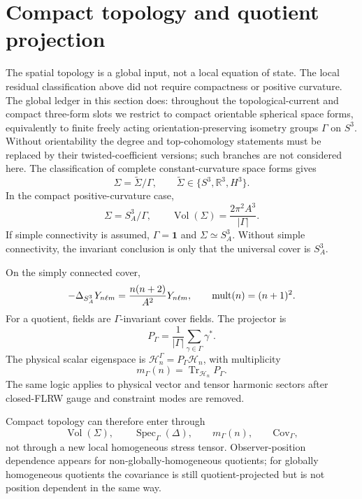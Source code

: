 \documentclass[
  aps,
  prd,
  reprint,
  superscriptaddress,
  floatfix,
  nofootinbib,
  longbibliography
]{revtex4-2}
\theoremstyle{plain}
\theoremstyle{definition}
\theoremstyle{remark}
\DeclareMathOperator{\Vol}{Vol}
\DeclareMathOperator{\Spec}{Spec}
\DeclareMathOperator{\Tr}{Tr}
\newcommand{\id}{\mathbf 1}
\newcommand{\R}{\mathbb R}
\newcommand{\PG}{P_\Gamma}
\newcommand{\Hn}{\mathcal H_n}
\begin{document}
\section{Compact topology and quotient projection}

The spatial topology is a global input, not a local equation of state.
The local residual classification above did not require compactness or positive
curvature.  The global ledger in this section does: throughout the
topological-current and compact three-form slots we restrict to compact
orientable spherical space forms, equivalently to finite freely acting
orientation-preserving isometry groups \(\Gamma\) on \(S^3\).  Without
orientability the degree and top-cohomology statements must be replaced by their
twisted-coefficient versions; such branches are not considered here.  The
classification of complete constant-curvature space forms gives~\cite{HawkingEllis,Wolf}
\begin{equation}
\Sigma=\widetilde\Sigma/\Gamma,
\qquad
\widetilde\Sigma\in\{S^3,\R^3,H^3\} .
\end{equation}
In the compact positive-curvature case,
\begin{equation}
\Sigma=S_A^3/\Gamma,
\qquad
\Vol(\Sigma)=\frac{2\pi^2A^3}{|\Gamma|} .
\label{eq:space_form_volume_v5}
\end{equation}
If simple connectivity is assumed, \(\Gamma=\id\) and \(\Sigma\simeq S_A^3\).
Without simple connectivity, the invariant conclusion is only that the
universal cover is \(S_A^3\).

On the simply connected cover,
\begin{equation}
-\Delta_{S_A^3}Y_{n\ell m}=\frac{n(n+2)}{A^2}Y_{n\ell m},
\qquad
{\rm mult}(n)=(n+1)^2 .
\label{eq:s3_spectrum_v5}
\end{equation}
For a quotient, fields are \(\Gamma\)-invariant cover fields.  The projector is
\begin{equation}
\boxed{
\PG=\frac1{|\Gamma|}\sum_{\gamma\in\Gamma}\gamma^* .
}
\label{eq:quotient_projector_v5}
\end{equation}
The physical scalar eigenspace is \(\Hn^\Gamma=\PG\Hn\), with multiplicity
\begin{equation}
m_\Gamma(n)=\Tr_{\Hn}\PG .
\label{eq:quotient_multiplicity_v5}
\end{equation}
The same logic applies to physical vector and tensor harmonic sectors after
closed-FLRW gauge and constraint modes are removed.

Compact topology can therefore enter through
\begin{equation}
\Vol(\Sigma),\qquad \Spec_\Gamma(\Delta),\qquad m_\Gamma(n),\qquad
\mathrm{Cov}_\Gamma,
\label{eq:topology_channels_v5}
\end{equation}
not through a new local homogeneous stress tensor.  Observer-position dependence
appears for non-globally-homogeneous quotients; for globally homogeneous
quotients the covariance is still quotient-projected but is not position
dependent in the same way.
\end{document}
